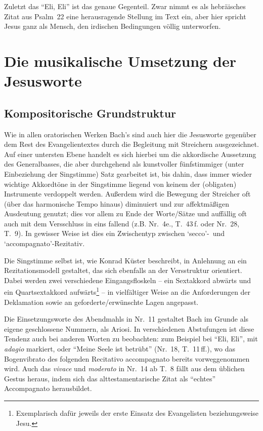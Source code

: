 \documentclass[a4paper,11pt,twoside]{scrartcl}
\begin{document}
Zuletzt das \enquote{Eli, Eli} ist das genaue Gegenteil.  Zwar nimmt
es als hebräisches Zitat aus Psalm~22 eine herausragende Stellung im
Text ein, aber hier spricht Jesus ganz als Mensch, den irdischen
Bedingungen völlig unterworfen.

\section{Die musikalische Umsetzung der Jesusworte}

\subsection{Kompositorische Grundstruktur}
Wie in allen oratorischen Werken Bach’s sind auch hier die Jesusworte
gegenüber dem Rest des Evangelientextes durch die Begleitung mit
Streichern ausgezeichnet.  Auf einer untersten Ebene handelt es sich
hierbei um die akkordische Aussetzung des Generalbasses, die aber
durchgehend als kunstvoller fünfstimmiger (unter Einbeziehung der
Singstimme) Satz gearbeitet ist, bis dahin, dass immer wieder
wichtige Akkordtöne in der Singstimme liegend von keinem der (obligaten)
Instrumente verdoppelt werden.  Außerdem wird die Bewegung der Streicher
oft (über das harmonische Tempo hinaus) diminuiert und zur affektmäßigen
Ausdeutung genutzt; dies vor allem zu Ende der Worte/Sätze und auffällig
oft auch mit dem Versschluss in eins fallend (z.B. Nr.~4e., T.~43\,f. oder
Nr.~28, T.~9).  In gewisser Weise ist dies ein Zwischentyp zwischen
\enquote*{secco}-~und \enquote*{accompagnato}-Rezitativ.

Die Singstimme selbst ist, wie Konrad Küster\cite{kuester} beschreibt,
in Anlehnung an ein Rezitationsmodell gestaltet, das sich ebenfalls
an der Versstruktur orientiert.  Dabei werden zwei verschiedene
Eingangsfloskeln – ein Sextakkord abwärts und ein Quartsextakkord
aufwärts\footnote{Exemplarisch dafür jeweils der erste Einsatz des
Evangelisten beziehungsweise Jesu.} – in vielfältiger Weise an die
Anforderungen der Deklamation sowie an geforderte/erwünschte Lagen
angepasst.

Die Einsetzungsworte des Abendmahls in Nr.~11 gestaltet Bach im Grunde
als eigene geschlossene Nummern, als Ariosi.  In verschiedenen
Abstufungen ist diese Tendenz auch bei anderen Worten zu beobachten:
zum Beispiel bei \enquote{Eli, Eli}, mit \textit{adagio} markiert, oder
\enquote{Meine Seele ist betrübt} (Nr.~18, T.~11\,ff.), wo das Bogenvibrato
des folgenden Recitativo accompagnato bereits vorweggenommen wird.  Auch
das \textit{vivace} und \textit{moderato} in Nr.~14 ab T.~8 fällt aus
dem üblichen Gestus heraus, indem sich das alttestamentarische Zitat
als \enquote{echtes} Accompagnato herausbildet.
\end{document}
